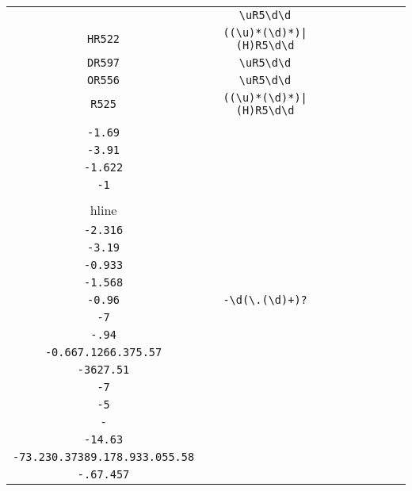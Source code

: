 \begin{longtable}{cccccccc}
\begin{tabular}{ll}
    \verb|RR562| & \verb|\uR5\d\d|\\
\verb|HR522| & \verb.((\u)*(\d)*)|(H)R5\d\d.\\
\verb|DR597| & \verb|\uR5\d\d|\\
\verb|OR556| & \verb|\uR5\d\d|\\
\verb|R525| & \verb.((\u)*(\d)*)|(H)R5\d\d.
\end{tabular}
\\\midrule 
\begin{tabular}{l}
    \verb|-4.26|\\
\verb|-1.69|\\
\verb|-3.91|\\
\verb|-1.622|\\
\verb|-1|\\
\\hline\\
\verb|-2.316|\\
\verb|-3.19|\\
\verb|-0.933|\\
\verb|-1.568|\\
\verb|-0.96|
\end{tabular}

&
\verb|-\d(\.(\d)+)?|
&

\begin{tabular}{l}
    \verb|-((\d)*(\d)*\.\d\d)*(\d)*|\\
\verb|-7|\\
\verb|-.94|\\
\verb|-0.667.1266.375.57|\\
\verb|-3627.51|\\
\verb|-7|
\end{tabular}

&

\begin{tabular}{l}
    \verb|-((\d)*\.\d\d)*(\d)*|\\
\verb|-5|\\
\verb|-|\\
\verb|-14.63|\\
\verb|-73.230.37389.178.933.055.58|\\
\verb|-.67.457|
\end{tabular}

&


\end{longtable}
